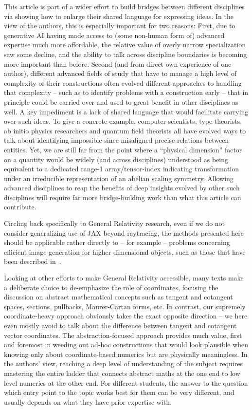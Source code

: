 \documentclass[twocolumn]{article}
\begin{document}
This article is part of a wider effort to build bridges between
different disciplines via showing how to enlarge their shared language
for expressing ideas. In the view of the authors, this is especially
important for two reasons: First, due to generative AI having made
access to (some non-human form of) advanced expertise much more
affordable, the relative value of overly narrow specialization saw
some decline, and the ability to talk across discipline boundaries is
becoming more important than before. Second (and from direct own
experience of one author), different advanced fields of study that
have to manage a high level of complexity of their constructions often
evolved different approaches to handling that complexity -- such as to
identify problems with a construction early -- that in principle could
be carried over and used to great benefit in other disciplines as
well. A key impediment is a lack of shared language that would
facilitate carrying over such ideas. To give a concrete example,
computer scientists, type theorists, ab initio physics researchers and
quantum field theorists all have evolved ways to talk about
identifying impossible-since-misaligned precise relations between
entities. Yet, we are still far from the point where a ``physical
dimension'' factor on a quantity would be widely (and across
disciplines) understood as being equivalent to a dedicated range-1
array/tensor-index indicating transformation under an irreducible
representation of an abelian scaling symmetry. Allowing advanced
disciplines to reap the benefits of deep insights evolved by other
such disciplines will require far more bridge-building work than what
this article can contribute.

Circling back specifically to General Relativity research, even if we
do not consider generalizing use of JAX beyond raytracing, the methods
presented here should be applicable rather directly to -- for example
-- problems concerning efficient image generation for higher
dimensional objects, such as those that have been described
in~\cite{hertog2019imaging}.

Looking at other efforts to make General Relativity accessible, many
texts make a deliberate choice to de-emphasize the role of
coordinates, focusing the discussion on abstract mathematical concepts
such as tangent and cotangent spaces, sections, pullbacks,
Maurer-Cartan forms, etc. In contrast, our supremely coordinate-heavy
approach obviously takes the exact opposite direction -- we here even
mostly avoid to talk about the difference between tangent and
cotangent vector coordinates. The abstraction-focused approach
provides much value, first and foremost in weeding out ad-hoc
constructions that would look plausible when knowing only about
coordinate-based numerics but are physically meaningless. In the
authors' view, reaching a deep level of understanding of the subject
requires mastering the entire ladder that connects abstract maths at
the one end to low level numerics at the other end. For different
students, the answer to the question which entry point to the topic
works best for them can be very different, and usually depends on
what they have prior expertise with.
\end{document}
